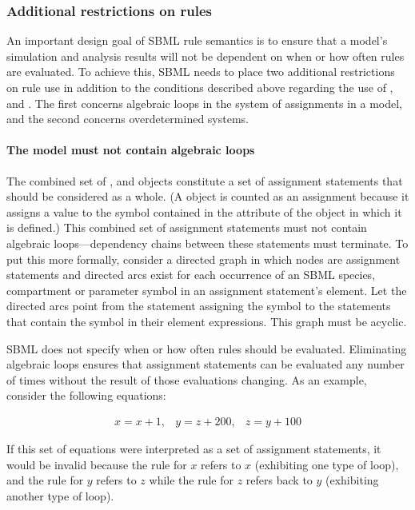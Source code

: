 \subsubsection{Additional restrictions on rules}
\label{sec:ruleconstraints}

An important design goal of SBML rule semantics is to ensure that
a model's simulation and analysis results will not be dependent on
when or how often rules are evaluated.  To achieve this, SBML
needs to place two additional restrictions on rule use in addition
to the conditions described above regarding the use of
\AlgebraicRule, \AssignmentRule and \RateRule.  The first concerns
algebraic loops in the system of assignments in a model, and the
second concerns overdetermined systems.


\paragraph{The model must not contain algebraic loops}

The combined set of \InitialAssignment, \AssignmentRule and
\KineticLaw objects constitute a set of assignment statements that
should be considered as a whole.  (A \KineticLaw object is counted
as an assignment because it assigns a value to the symbol
contained in the  attribute of the \Reaction object in which
it is defined.)  This combined set of assignment statements must
not contain algebraic loops---dependency chains between these
statements must terminate.  To put this more formally, consider a
directed graph in which nodes are assignment statements and
directed arcs exist for each occurrence of an SBML species,
compartment or parameter symbol in an assignment statement's
 element.  Let the directed arcs point from the
statement assigning the symbol to the statements that contain the
symbol in their  element expressions.  This graph must
be acyclic.

SBML does not specify when or how often rules should be evaluated.
Eliminating algebraic loops ensures that assignment statements can
be evaluated any number of times without the result of those
evaluations changing.  As an example, consider the following
equations:
\begin{linenomath}
\begin{equation*}
  \begin{array}{lll}
    x = x + 1, & y = z + 200, & z = y + 100
  \end{array}
\end{equation*}
\end{linenomath}
If this set of equations were interpreted as a set of assignment
statements, it would be invalid because the rule for $x$ refers to
$x$ (exhibiting one type of loop), and the rule for $y$ refers to
$z$ while the rule for $z$ refers back to $y$ (exhibiting another
type of loop).

